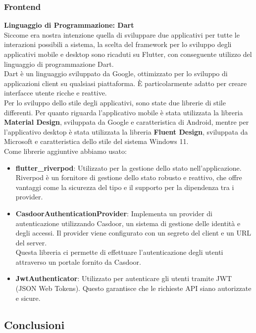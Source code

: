 \documentclass{article}
\begin{document}
\subsubsection{Frontend}
\textbf{Linguaggio di Programmazione: Dart}\\
Siccome era nostra intenzione quella di sviluppare due applicativi per tutte le interazioni possibili a sistema, la scelta del framework per lo sviluppo degli applicativi mobile e desktop sono ricaduti su Flutter, con conseguente utilizzo del linguaggio di programmazione Dart.\\
 Dart è un linguaggio sviluppato da Google, ottimizzato per lo sviluppo di applicazioni client su qualsiasi piattaforma. È particolarmente adatto per creare interfacce utente ricche e reattive.\\
Per lo sviluppo dello stile degli applicativi, sono state due librerie di stile differenti. Per quanto riguarda l'applicativo mobile è stata utilizzata la libreria \textbf{Material Design}, sviluppata da Google e caratteristica di Android, mentre per l'applicativo desktop è stata utilizzata la libreria \textbf{Fluent Design}, sviluppata da Microsoft e caratteristica dello stile del sistema Windows 11.\\
Come librerie aggiuntive abbiamo usato:
\begin{itemize}
    \item \textbf{flutter\_riverpod}: Utilizzato per la gestione dello stato nell'applicazione. Riverpod è un fornitore di gestione dello stato robusto e reattivo, che offre vantaggi come la sicurezza del tipo e il supporto per la dipendenza tra i provider.
    \item \textbf{CasdoorAuthenticationProvider}: Implementa un provider di autenticazione utilizzando Casdoor, un sistema di gestione delle identità e degli accessi. Il provider viene configurato con un segreto del client e un URL del server. \\
    Questa libreria ci permette di effettuare l'autenticazione degli utenti attraverso un portale fornito da Casdoor. 
    \item \textbf{JwtAuthenticator}: Utilizzato per autenticare gli utenti tramite JWT (JSON Web Tokens). Questo garantisce che le richieste API siano autorizzate e sicure.
\end{itemize}

\subsection{Conclusioni}
\end{document}
